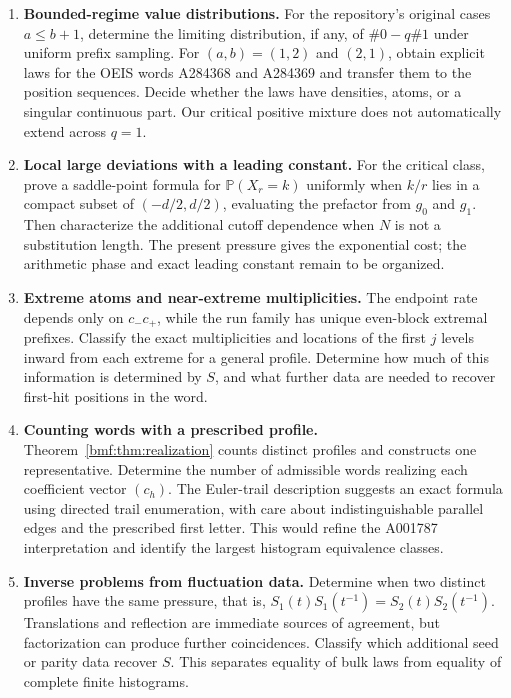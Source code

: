 \documentclass[11pt]{article}
\numberwithin{equation}{section}
\theoremstyle{definition}
\theoremstyle{remark}
\newcommand{\Prob}{\mathbb P}
\begin{document}
\begin{enumerate}[leftmargin=*,itemsep=7pt]
\item \textbf{Bounded-regime value distributions.}
For the repository's original cases $a\leq b+1$, determine the
limiting distribution, if any, of $\#0-q\#1$ under uniform prefix
sampling. For $(a,b)=(1,2)$ and $(2,1)$, obtain explicit laws
for the OEIS words A284368 and A284369 and transfer them to
the position sequences. Decide whether the laws have densities,
atoms, or a singular continuous part. Our critical positive
mixture does not automatically extend across $q=1$.

\item \textbf{Local large deviations with a leading constant.}
For the critical class, prove a saddle-point formula for
$\Prob(X_r=k)$ uniformly when $k/r$ lies in a compact subset
of $(-d/2,d/2)$, evaluating the prefactor from $g_0$ and $g_1$.
Then characterize the additional cutoff dependence when
$N$ is not a substitution length. The present pressure gives
the exponential cost; the arithmetic phase and exact leading
constant remain to be organized.

\item \textbf{Extreme atoms and near-extreme multiplicities.}
The endpoint rate depends only on $c_-c_+$, while the run family
has unique even-block extremal prefixes. Classify the exact
multiplicities and locations of the first $j$ levels inward
from each extreme for a general profile. Determine how much
of this information is determined by $S$, and what further
data are needed to recover first-hit positions in the word.

\item \textbf{Counting words with a prescribed profile.}
Theorem~\ref{bmf:thm:realization} counts distinct profiles and constructs
one representative. Determine the number of admissible words
realizing each coefficient vector $(c_h)$. The Euler-trail
description suggests an exact formula using directed trail
enumeration, with care about indistinguishable parallel edges
and the prescribed first letter. This would refine the
A001787 interpretation and identify the largest histogram
equivalence classes.

\item \textbf{Inverse problems from fluctuation data.}
Determine when two distinct profiles have the same pressure,
that is,
$S_1(t)S_1(t^{-1})=S_2(t)S_2(t^{-1})$.
Translations and reflection are immediate sources of agreement,
but factorization can produce further coincidences.
Classify which additional seed or parity data recover $S$.
This separates equality of bulk laws from equality of complete
finite histograms.


\end{enumerate}
\end{document}
